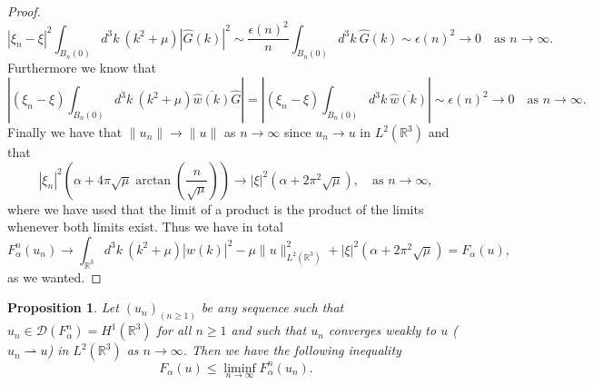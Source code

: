 \documentclass[a4paper,11pt]{article}
\newcommand{\dom}[1]{\mathscr D\left(#1\right)}
\newcommand{\R}{\mathbb{R}}
\newtheorem{proposition}{Proposition}
\numberwithin{equation}{section}
\begin{document}
\begin{proof}
\begin{equation}
	|\xi_n-\xi|^2\int_{B_n(0)} d^3k\ \left(k^2+\mu\right)|\hat{G}(k)|^2\sim\frac{\epsilon(n)^2}{n}\int_{B_n(0)} d^3k\ \hat{G}(k)\sim\epsilon(n)^2\to 0\quad\text{as }n\to\infty.
	\end{equation}
	Furthermore we know that \begin{equation}
	\left\lvert(\xi_n-\xi)\int_{B_n(0)} d^3k\ \left(k^2+\mu\right)\overline{\hat{w}(k)}\hat{G}\right\rvert=\left\lvert(\xi_n-\xi)\int_{B_n(0)} d^3k\ \overline{\hat{w}(k)}\right\rvert\sim\epsilon(n)^2\to0\quad\text{as }n\to\infty.
	\end{equation}
	Finally we have that $  \|u_n\|\to\|u\|$ as $ n\to\infty $ since $ u_n\to u $ in $ L^2(\R^3) $ and that \begin{equation}
	|\xi_n|^2\left(\alpha+4\pi\sqrt{\mu}\arctan\left(\frac{n}{\sqrt{\mu}}\right)\right)\to|\xi|^2\left(\alpha+2\pi^2\sqrt{\mu}\right),\quad \text{as }n\to\infty,
	\end{equation}
	where we have used that the limit of a product is the product of the limits whenever both limits exist. Thus we have in total\begin{equation}
	F_\alpha^n(u_n)\to\int_{\R^3} d^3k\ \left(k^2+\mu\right)|\hat{w}(k)|^2-\mu\|u\|^2_{L^2(\R^3)}+|\xi|^2\left(\alpha+2\pi^2\sqrt{\mu}\right)=F_\alpha(u),
	\end{equation}
	as we wanted.
\end{proof}
\begin{proposition}\label{F Gamma lower bound}
	Let $ (u_n)_{(n\geq1)} $ be any sequence such that $ u_n\in\dom{F_\alpha^n}=H^1(\R^3) $ for all $ n\geq1 $ and such that $ u_n $ converges weakly to $ u $ ($ u_n\rightharpoonup u $) in $ L^2(\R^3) $ as $ n\to\infty $. Then we have the following inequality\begin{equation}
	F_\alpha(u)\leq\liminf_{n\to\infty}F_\alpha^n(u_n).
	\end{equation}
\end{proposition}
\end{document}
